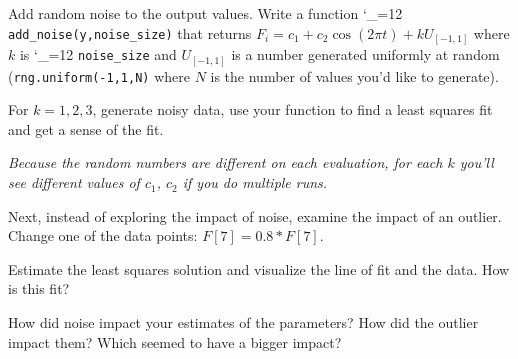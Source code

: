 \documentclass[12pt,letterpaper,noanswers]{exam}
\makeatletter
\newcommand{\pyf}{%
  \begingroup\catcode`_=12
  \pyf@
}
\newcommand{\pyf@}[1]{\texttt{#1}\endgroup}
\makeatother
\begin{document}
\begin{questions}
\begin{parts}
\item Add random noise to the output values.  Write a function \pyf{add_noise(y,noise_size)} that returns $F_i = c_1 + c_2 \cos(2\pi t) + kU_{[-1,1]}$ where $k$ is \pyf{noise_size} and 
$U_{[-1,1]}$ is a number generated uniformly at random (\texttt{rng.uniform(-1,1,N)} where $N$ is the number of values you'd like to generate).

For $k = 1, 2, 3$, generate noisy data, use your function to find a least squares fit and get a sense of the fit.

\emph{Because the random numbers are different on each evaluation, for each $k$ you'll see different values of $c_1$, $c_2$ if you do multiple runs.}

\item Next, instead of exploring the impact of noise, examine the impact of an outlier.  Change one of the data points: $F[7] = 0.8*F[7]$.  

Estimate the least squares solution and visualize the line of fit and the data.  How is this fit?

\item How did noise impact your estimates of the parameters?  How did the outlier impact them?  Which seemed to have a bigger impact?
\end{parts}











\end{questions}
\end{document}
